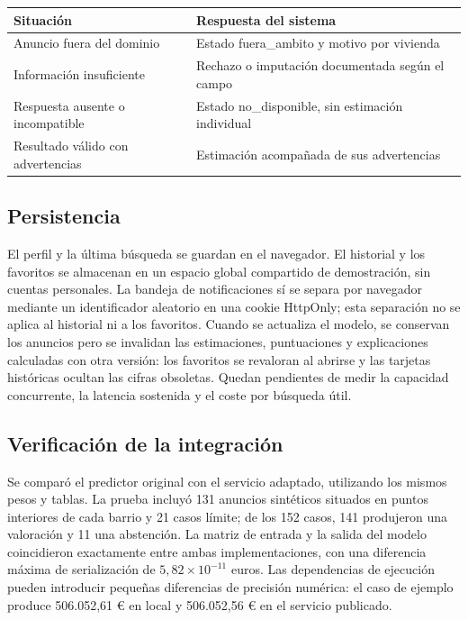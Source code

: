 \documentclass[11pt,a4paper]{article}
\newcommand{\thead}[1]{\textbf{#1}}
\newcounter{anexo}
\newcounter{anexosub}[anexo]
\begin{document}
\begin{center}
\begin{tabularx}{\linewidth}{@{}L L@{}}
\toprule
\thead{Situación} & \thead{Respuesta del sistema} \\
\midrule
Anuncio fuera del dominio & Estado fuera\_ambito y motivo por vivienda \\
Información insuficiente & Rechazo o imputación documentada según el campo \\
Respuesta ausente o incompatible & Estado no\_disponible, sin estimación individual \\
Resultado válido con advertencias & Estimación acompañada de sus advertencias \\
\bottomrule
\end{tabularx}
\end{center}

%
\subsection*{\theanexo\hspace{0.3em}\hspace{0.45em}Persistencia}

El perfil y la última búsqueda se guardan en el navegador. El historial y los favoritos se almacenan en un espacio global compartido de demostración, sin cuentas personales. La bandeja de notificaciones sí se separa por navegador mediante un identificador aleatorio en una cookie HttpOnly; esta separación no se aplica al historial ni a los favoritos. Cuando se actualiza el modelo, se conservan los anuncios pero se invalidan las estimaciones, puntuaciones y explicaciones calculadas con otra versión: los favoritos se revaloran al abrirse y las tarjetas históricas ocultan las cifras obsoletas. Quedan pendientes de medir la capacidad concurrente, la latencia sostenida y el coste por búsqueda útil.

%
\subsection*{\theanexo\hspace{0.3em}\hspace{0.45em}Verificación de la integración}

Se comparó el predictor original con el servicio adaptado, utilizando los mismos pesos y tablas. La prueba incluyó 131 anuncios sintéticos situados en puntos interiores de cada barrio y 21 casos límite; de los 152 casos, 141 produjeron una valoración y 11 una abstención. La matriz de entrada y la salida del modelo coincidieron exactamente entre ambas implementaciones, con una diferencia máxima de serialización de $5{,}82 \times 10^{-11}$ euros. Las dependencias de ejecución pueden introducir pequeñas diferencias de precisión numérica: el caso de ejemplo produce 506.052,61 € en local y 506.052,56 € en el servicio publicado.
\end{document}
